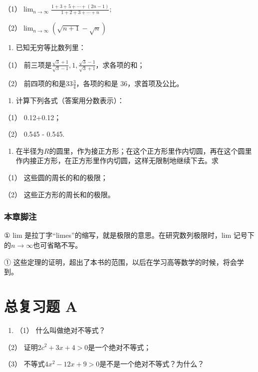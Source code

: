 （1）\(\lim_{n\to \infty}\frac{1 + 3 + 5 + \cdots + (2n - 1)}{1 + 2 + 3 + \cdots + n};\)

（2）\(\lim_{n\to \infty}(\sqrt{n + 1} -\sqrt{n})\)

\begin{enumerate}[start=3]
\item
  已知无穷等比数列里：
\end{enumerate}

（1）
前三项是\(\frac{\sqrt{3} + 1}{\sqrt{3} - 1}, 1, \frac{\sqrt{3} - 1}{\sqrt{3} + 1}\)，求各项的和；

（2） 前四项的和是\(33\frac{3}{4}\)，各项的和是 36，求首项及公比。

\begin{enumerate}[start=4]
\item
  计算下列各式（答案用分数表示）：
\end{enumerate}

（1） 0.12+0.12；

（2） 0.545 - 0.545.

\begin{enumerate}[start=6]
\item
  在半径为\(R\)的圆里，作为接正方形；在这个正方形里作内切圆，再在这个圆里作内接正方形，在正方形里作内切圆，这样无限制地继续下去。求
\end{enumerate}

（1） 这些圆的周长的和的极限；

（2） 这些正方形的周长和的极限。

\subsection{本章脚注}

① lim 是拉丁字``limes''的缩写，就是极限的意思。在研究数列极限时，lim
记号下的\(n \to \infty\)也可省略不写。

① 这些定理的证明，超出了本书的范围，以后在学习高等数学的时候，将会学到。

\chapter{总复习题 A}

\begin{enumerate}
\item
  （1） 什么叫做绝对不等式？
\end{enumerate}

（2） 证明\(2c^{2} + 3x + 4 > 0\)是一个绝对不等式；

（3） 不等式\(4x^{2} - 12x + 9 > 0\)是不是一个绝对不等式？为什么？

